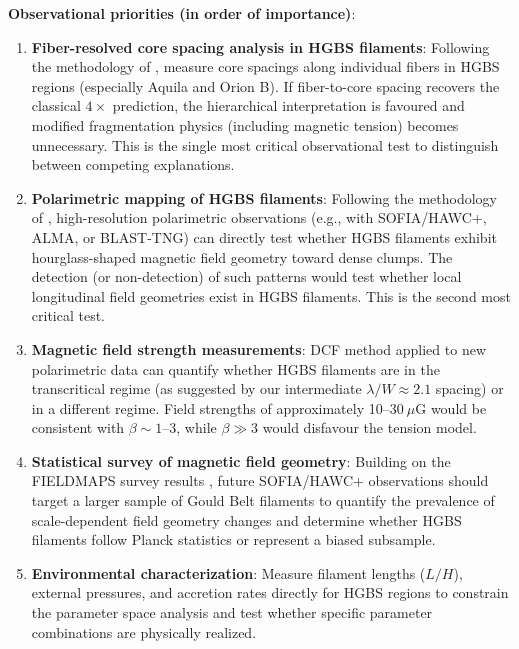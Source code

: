 \documentclass[11pt,a4paper]{article}
\begin{document}
\textbf{Observational priorities (in order of importance)}:
\begin{enumerate}
    \item \textbf{Fiber-resolved core spacing analysis in HGBS filaments}: Following the methodology of \citet{Yang2024}, measure core spacings along individual fibers in HGBS regions (especially Aquila and Orion B). If fiber-to-core spacing recovers the classical $4\times$ prediction, the hierarchical interpretation is favoured and modified fragmentation physics (including magnetic tension) becomes unnecessary. This is the single most critical observational test to distinguish between competing explanations.

    \item \textbf{Polarimetric mapping of HGBS filaments}: Following the methodology of \citet{Jadhav2026}, high-resolution polarimetric observations (e.g., with SOFIA/HAWC+, ALMA, or BLAST-TNG) can directly test whether HGBS filaments exhibit hourglass-shaped magnetic field geometry toward dense clumps. The detection (or non-detection) of such patterns would test whether local longitudinal field geometries exist in HGBS filaments. This is the second most critical test.

    \item \textbf{Magnetic field strength measurements}: DCF method applied to new polarimetric data can quantify whether HGBS filaments are in the transcritical regime (as suggested by our intermediate $\lambda/W \approx 2.1$ spacing) or in a different regime. Field strengths of approximately 10--$30~\mu$G would be consistent with $\beta \sim 1$--$3$, while $\beta \gg 3$ would disfavour the tension model.

    \item \textbf{Statistical survey of magnetic field geometry}: Building on the FIELDMAPS survey results \citep{Coude2025}, future SOFIA/HAWC+ observations should target a larger sample of Gould Belt filaments to quantify the prevalence of scale-dependent field geometry changes and determine whether HGBS filaments follow Planck statistics or represent a biased subsample.

    \item \textbf{Environmental characterization}: Measure filament lengths ($L/H$), external pressures, and accretion rates directly for HGBS regions to constrain the parameter space analysis and test whether specific parameter combinations are physically realized.
\end{enumerate}
\end{document}
